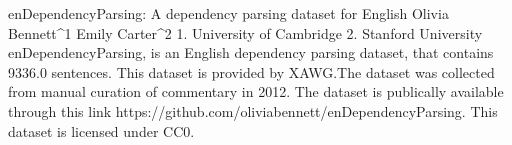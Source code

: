 
enDependencyParsing: A dependency parsing dataset for English
Olivia Bennett^1 Emily Carter^2
1. University of Cambridge 2. Stanford University
enDependencyParsing, is an English dependency parsing dataset, that contains 9336.0 sentences.
This dataset is provided by XAWG.The dataset was collected from manual curation of commentary in 2012. 
The dataset is publically available through this link https://github.com/oliviabennett/enDependencyParsing. This dataset is licensed under CC0.

